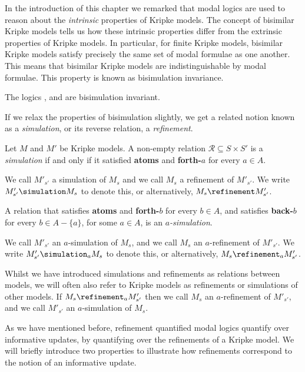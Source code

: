 In the introduction of this chapter we remarked that modal logics are used to
reason about the {\em intrinsic} properties of Kripke models. The concept of
bisimilar Kripke models tells us how these intrinsic properties differ from the
extrinsic properties of Kripke models. In particular, for finite Kripke models,
bisimilar Kripke models satisfy precisely the same set of modal formulae as one
another. This means that bisimilar Kripke models are indistinguishable by modal
formulae. This property is known as bisimulation invariance.

\begin{lemma}
The logics \logicK{}, \logicKD{} and \logicS{} are bisimulation invariant.
\end{lemma}


If we relax the properties of bisimulation slightly, we get a related notion
known as a {\em simulation}, or its reverse relation, a {\em refinement}.

\begin{definition}
Let $M$ and $M'$ be Kripke models. A non-empty relation $\mathcal{R}
\subseteq S \times S'$ is a \textit{simulation} if and only if it satisfied {\bf
atoms} and {\bf forth-$a$} for every $a \in A$.

We call $M'_{s'}$ a simulation of $M_s$ and we call $M_s$ a refinement of
$M'_{s'}$. We write $M'_{s'} \simulation M_s$ to denote this, or alternatively,
$M_s \refinement M'_{s'}$.

A relation that satisfies {\bf atoms} and {\bf forth-$b$} for every $b \in A$,
and satisfies {\bf back-$b$} for every $b \in A - \{a\}$, for some $a \in A$, is
an $a$\textit{-simulation}. 

We call $M'_{s'}$ an $a$-simulation of $M_s$, and we call $M_s$ an
$a$-refinement of $M'_{s'}$. We write $M'_{s'} \simulation_a M_s$ to denote
this, or alternatively, $M_s \refinement_a M'_{s'}$.
\end{definition}

Whilst we have introduced simulations and refinements as relations between
models, we will often also refer to Kripke models as refinements or simulations
of other models. If $M_s \refinement_a M'_{s'}$ then we call $M_s$ an
$a$-refinement of $M'_{s'}$, and we call $M'_{s'}$ an $a$-simulation of $M_s$.

As we have mentioned before, refinement quantified modal logics quantify over
informative updates, by quantifying over the refinements of a Kripke model. We
will briefly introduce two properties to illustrate how refinements correspond
to the notion of an informative update.

